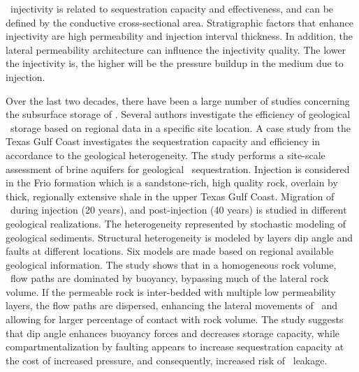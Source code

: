 \coo\ injectivity is related to sequestration capacity and effectiveness, and can be defined by the conductive cross-sectional area. Stratigraphic factors that enhance injectivity are high permeability and injection interval thickness. In addition, the lateral permeability architecture can influence the injectivity quality. The lower the injectivity is, the higher will be the pressure buildup in the medium due to injection.


Over the last two decades, there have been a large number of studies concerning the subsurface storage of \coo. Several authors investigate the efficiency of geological \coo\ storage based on regional data in a specific site location. A case study from the Texas Gulf Coast \cite{hovorka2004impact} investigates the sequestration capacity and efficiency in accordance to the geological heterogeneity. The study performs a site-scale assessment of brine aquifers for geological \coo\ sequestration. Injection is considered in the Frio formation which is a sandstone-rich, high quality rock, overlain by thick, regionally extensive shale in the upper Texas Gulf Coast. Migration of \coo\ during injection (20 years), and post-injection (40 years) is studied in different geological realizations. The heterogeneity represented by stochastic modeling of geological sediments. Structural heterogeneity is modeled by layers dip angle and faults at different locations. Six models are made based on regional available geological information. The study shows that in a homogeneous rock volume, \coo\ flow paths are dominated by buoyancy, bypassing much of the lateral rock volume. If the permeable rock is inter-bedded with multiple low permeability layers, the flow paths are dispersed, enhancing the lateral movements of  \coo\ and allowing for larger percentage of contact with rock volume. The study suggests that dip angle enhances buoyancy forces and decreases storage capacity, while compartmentalization by faulting appears to increase sequestration capacity at the cost of increased pressure, and consequently, increased risk of \coo\ leakage.

